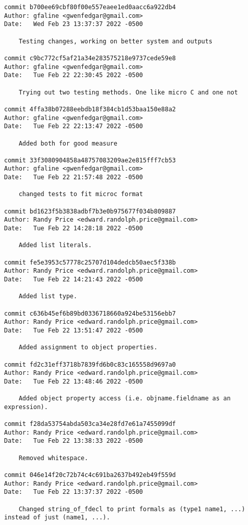 {\begin{verbatim}
commit b700ee69cbf80f00e557eaee1ed0aacc6a922db4
Author: gfaline <gwenfedgar@gmail.com>
Date:   Wed Feb 23 13:37:37 2022 -0500

    Testing changes, working on better system and outputs

commit c9bc772cf5af21a34e283575218e9737cede59e8
Author: gfaline <gwenfedgar@gmail.com>
Date:   Tue Feb 22 22:30:45 2022 -0500

    Trying out two testing methods. One like micro C and one not

commit 4ffa38b07288eebdb18f384cb1d53baa150e88a2
Author: gfaline <gwenfedgar@gmail.com>
Date:   Tue Feb 22 22:13:47 2022 -0500

    Added both for good measure

commit 33f3080904858a48757083209ae2e815fff7cb53
Author: gfaline <gwenfedgar@gmail.com>
Date:   Tue Feb 22 21:57:48 2022 -0500

    changed tests to fit microc format

commit bd1623f5b3838adbf7b3e0b975677f034b809887
Author: Randy Price <edward.randolph.price@gmail.com>
Date:   Tue Feb 22 14:28:18 2022 -0500

    Added list literals.

commit fe5e3953c57778c25707d104dedcb50aec5f338b
Author: Randy Price <edward.randolph.price@gmail.com>
Date:   Tue Feb 22 14:21:43 2022 -0500

    Added list type.

commit c636b45ef6b89bd0336718660a924be53156ebb7
Author: Randy Price <edward.randolph.price@gmail.com>
Date:   Tue Feb 22 13:51:47 2022 -0500

    Added assignment to object properties.

commit fd2c31eff3718b7839fd6b0c83c165558d9697a0
Author: Randy Price <edward.randolph.price@gmail.com>
Date:   Tue Feb 22 13:48:46 2022 -0500

    Added object property access (i.e. objname.fieldname as an expression).

commit f28da53754abda503ca34e28fd7e61a7455099df
Author: Randy Price <edward.randolph.price@gmail.com>
Date:   Tue Feb 22 13:38:33 2022 -0500

    Removed whitespace.

commit 046e14f20c72b74c4c691ba2637b492eb49f559d
Author: Randy Price <edward.randolph.price@gmail.com>
Date:   Tue Feb 22 13:37:37 2022 -0500

    Changed string_of_fdecl to print formals as (type1 name1, ...) instead of just (name1, ...).


\end{verbatim}}
